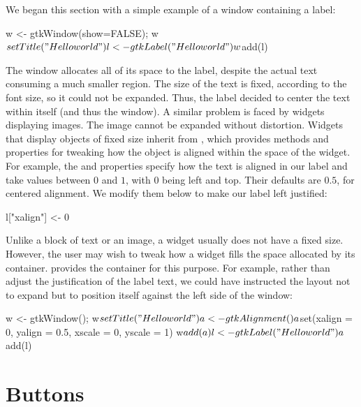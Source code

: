 We began this section with a simple example of a window containing a
label:
\begin{Schunk}
\begin{Sinput}
 w <- gtkWindow(show=FALSE); w$setTitle("Hello world")
 l <- gtkLabel("Hello world")
 w$add(l)
\end{Sinput}
\end{Schunk}
%
The window allocates all of its space to the label, despite the actual
text consuming a much smaller region. The size of the text is fixed,
according to the font size, so it could not be expanded. Thus, the
label decided to center the text within itself (and thus the
window). A similar problem is faced by widgets displaying images. The
image cannot be expanded without distortion. Widgets that display
objects of fixed size inherit from , which provides
methods and properties for tweaking how the object is aligned within
the space of the widget. For example, the  and
 properties specify how the text is aligned in our label
and take values between $0$ and $1$, with $0$ being left and
top. Their defaults are $0.5$, for centered alignment. We modify them
below to make our label left justified:
\begin{Schunk}
\begin{Sinput}
 l["xalign"] <- 0
\end{Sinput}
\end{Schunk}

Unlike a block of text or an image, a widget usually does not have a
fixed size. However, the user may wish to tweak how a widget fills
the space allocated by its container.  \GTK\/ provides the
 container for this purpose. For example, rather
than adjust the justification of the label text, we could have
instructed the layout not to expand but to position itself against the
left side of the window:
\begin{Schunk}
\begin{Sinput}
 w <- gtkWindow(); w$setTitle("Hello world")
 a <- gtkAlignment()
 a$set(xalign = 0, yalign = 0.5, xscale = 0, yscale = 1)
 w$add(a)
 l <- gtkLabel("Hello world")
 a$add(l)
\end{Sinput}
\end{Schunk}

\section{Buttons}
\label{sec:RGtk2:gtkButton}

